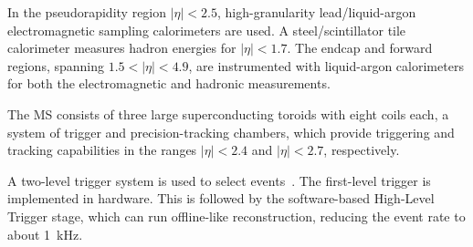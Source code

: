 \documentclass{outhesis}
\begin{document}
In the pseudorapidity region $|\eta| < 2.5$, high-granularity lead/liquid-argon 
electromagnetic sampling calorimeters are used.
A steel/scintillator tile calorimeter measures hadron energies for $|\eta| < 1.7$.
The endcap and forward regions, spanning $1.5<|\eta| <4.9$, are 
instrumented with liquid-argon calorimeters 
for both the electromagnetic and hadronic measurements. 

The MS consists of three large superconducting toroids
with eight coils each, 
a system of trigger and precision-tracking chambers, 
which provide triggering and tracking capabilities in the
ranges $|\eta| < 2.4$ and $|\eta| < 2.7$, respectively.

A two-level trigger system is used to select events~\cite{Aad:2012xs,ATL-DAQ-PUB-2016-001,Aaboud:2016leb}. The first-level
trigger is implemented in hardware. This is followed by the software-based High-Level Trigger stage,
which can run offline-like reconstruction, reducing the event rate to about \SI{1}{kHz}.
\end{document}
